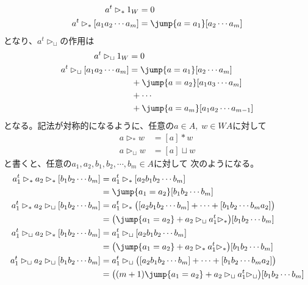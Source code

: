 		\begin{equation*}\begin{split} %
			a^t\rhd_* 1_W &= 0 \\
			a^t\rhd_* [a_1a_2\cdots a_m] &= \jump{a=a_1}[a_2\cdots a_m] \\
		\end{split}\end{equation*} %
		となり、$a^t\rhd_\sqcup$の作用は
		\begin{equation*}\begin{split} %
			a^t\rhd_\sqcup 1_W &= 0 \\
			a^t\rhd_\sqcup [a_1a_2\cdots a_m]
				&= \jump{a=a_1}[a_2\cdots a_m] \\
				&\;+ \jump{a=a_2}[a_1a_3\cdots a_m] \\
				&\;+ \cdots \\
				&\;+ \jump{a=a_m}[a_1a_2\cdots a_{m-1}] \\
		\end{split}\end{equation*} %
		となる。記法が対称的になるように、任意の$a\in A,\;w\in WA$に対して
		\begin{equation*}\begin{split} %
			a\rhd_*w &= [a]*w \\
			a\rhd_\sqcup w &= [a]\sqcup w
		\end{split}\end{equation*} %
		と書くと、任意の$a_1,a_2,b_1,b_2,\cdots,b_m\in A$に対して
		次のようになる。
		\begin{equation*}\begin{split} %
			a_1^t\rhd_*a_2\rhd_*[b_1b_2\cdots b_m] 
			&= a_1^t\rhd_*[a_2b_1b_2\cdots b_m] \\
			&= \jump{a_1=a_2}[b_1b_2\cdots b_m] \\
			a_1^t\rhd_*a_2\rhd_\sqcup[b_1b_2\cdots b_m] 
			&= a_1^t\rhd_*\bigl([a_2b_1b_2\cdots b_m]+\cdots+[b_1b_2\cdots b_ma_2]\bigr) \\
			&= \bigl(\jump{a_1=a_2}+a_2\rhd_\sqcup a_1^t\rhd_*\bigr)[b_1b_2\cdots b_m] \\
			a_1^t\rhd_\sqcup a_2\rhd_*[b_1b_2\cdots b_m] 
			&= a_1^t\rhd_\sqcup[a_2b_1b_2\cdots b_m] \\
			&= \bigl(\jump{a_1=a_2}+a_2\rhd_* a_1^t\rhd_*\bigr)[b_1b_2\cdots b_m] \\
			a_1^t\rhd_\sqcup a_2\rhd_\sqcup[b_1b_2\cdots b_m]
			&= a_1^t\rhd_\sqcup\bigl([a_2b_1b_2\cdots b_m]+\cdots+[b_1b_2\cdots b_ma_2]\bigr) \\
			&= \bigl((m+1)\jump{a_1=a_2}+a_2\rhd_\sqcup a_1^t\rhd_\sqcup\bigr)[b_1b_2\cdots b_m] \\
		\end{split}\end{equation*} %

